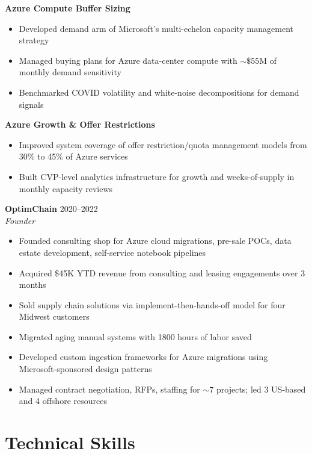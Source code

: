 \documentclass[10pt,letterpaper]{article}
\begin{document}
\vspace{2pt}
\textbf{Azure Compute Buffer Sizing}
\begin{itemize}
  \item Developed demand arm of Microsoft's multi-echelon capacity management strategy
  \item Managed buying plans for Azure data-center compute with ${\sim}\$55$M of monthly demand sensitivity
  \item Benchmarked COVID volatility and white-noise decompositions for demand signals
\end{itemize}

\vspace{4pt}
\textbf{Azure Growth \& Offer Restrictions}
\begin{itemize}
  \item Improved system coverage of offer restriction/quota management models from 30\% to 45\% of Azure services
  \item Built CVP-level analytics infrastructure for growth and weeks-of-supply in monthly capacity reviews
\end{itemize}

\vspace{6pt}
\textbf{OptimChain} \hfill 2020--2022\\
\textit{Founder}
\begin{itemize}
  \item Founded consulting shop for Azure cloud migrations, pre-sale POCs, data estate development, self-service notebook pipelines
  \item Acquired \$45K YTD revenue from consulting and leasing engagements over 3 months
  \item Sold supply chain solutions via implement-then-hands-off model for four Midwest customers
  \item Migrated aging manual systems with 1800 hours of labor saved
  \item Developed custom ingestion frameworks for Azure migrations using Microsoft-sponsored design patterns
  \item Managed contract negotiation, RFPs, staffing for ${\sim}7$ projects; led 3 US-based and 4 offshore resources
\end{itemize}

\section{Technical Skills}
\end{document}
